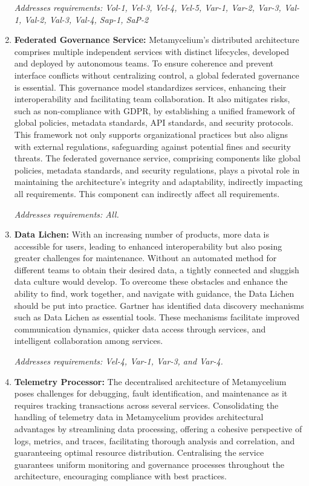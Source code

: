 \documentclass[journal]{IEEEtran}
\begin{document}
\begin{enumerate}
    \textit{Addresses requirements: Vol-1, Vel-3, Vel-4, Vel-5, Var-1, Var-2, Var-3, Val-1, Val-2, Val-3, Val-4, Sap-1, SaP-2} 
  
    \item  \textbf{Federated Governance Service:} Metamycelium's distributed architecture comprises multiple independent services with distinct lifecycles, developed and deployed by autonomous teams. To ensure coherence and prevent interface conflicts without centralizing control, a global federated governance is essential. This governance model standardizes services, enhancing their interoperability and facilitating team collaboration. It also mitigates risks, such as non-compliance with GDPR, by establishing a unified framework of global policies, metadata standards, API standards, and security protocols. This framework not only supports organizational practices but also aligns with external regulations, safeguarding against potential fines and security threats. The federated governance service, comprising components like global policies, metadata standards, and security regulations, plays a pivotal role in maintaining the architecture's integrity and adaptability, indirectly impacting all requirements. This component can indirectly affect all requirements.

    \textit{Addresses requirements: All.}     

    \item \textbf{Data Lichen:} With an increasing number of products, more data is accessible for users, leading to enhanced interoperability but also posing greater challenges for maintenance. Without an automated method for different teams to obtain their desired data, a tightly connected and sluggish data culture would develop. To overcome these obstacles and enhance the ability to find, work together, and navigate with guidance, the Data Lichen should be put into practice. Gartner has identified data discovery mechanisms such as Data Lichen as essential tools. These mechanisms facilitate improved communication dynamics, quicker data access through services, and intelligent collaboration among services.

    \textit{Addresses requirements: Vel-4, Var-1, Var-3, and Var-4.} 
    
    
    \item \textbf{Telemetry Processor:}  The decentralised architecture of Metamycelium poses challenges for debugging, fault identification, and maintenance as it requires tracking transactions across several services. Consolidating the handling of telemetry data in Metamycelium provides architectural advantages by streamlining data processing, offering a cohesive perspective of logs, metrics, and traces, facilitating thorough analysis and correlation, and guaranteeing optimal resource distribution. Centralising the service guarantees uniform monitoring and governance processes throughout the architecture, encouraging compliance with best practices.


\end{enumerate}
\end{document}
